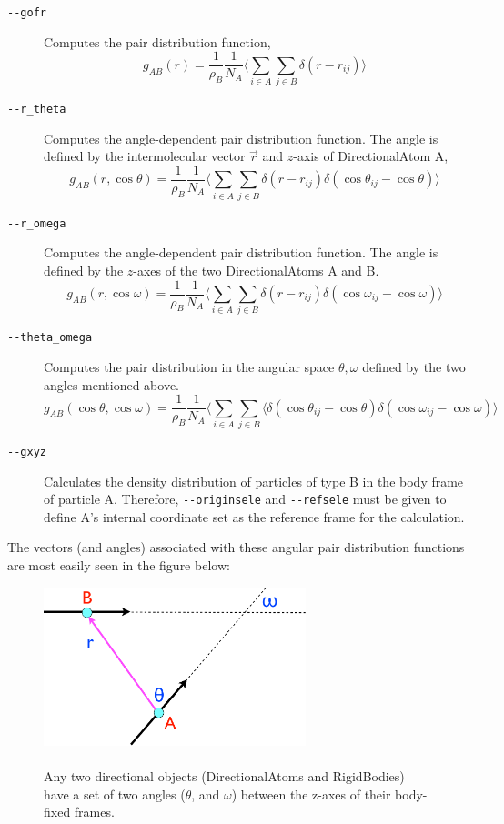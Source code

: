 \documentclass[]{book}
\begin{document}
\begin{description}
\item[{\tt -{}-gofr}] Computes the pair distribution function,
\begin{equation*}
g_{AB}(r) = \frac{1}{\rho_B}\frac{1}{N_A} \langle \sum_{i \in A}
\sum_{j \in B} \delta(r - r_{ij}) \rangle
\end{equation*}
\item[{\tt -{}-r\_theta}] Computes the angle-dependent pair distribution
function. The angle is defined by the intermolecular vector $\vec{r}$ and
$z$-axis of DirectionalAtom A,
\begin{equation*}
g_{AB}(r, \cos \theta) = \frac{1}{\rho_B}\frac{1}{N_A} \langle \sum_{i \in A}
\sum_{j \in B} \delta(r - r_{ij}) \delta(\cos \theta_{ij} - \cos \theta)\rangle
\end{equation*}
\item[{\tt -{}-r\_omega}] Computes the angle-dependent pair distribution
function. The angle is defined by the $z$-axes of the two
DirectionalAtoms A and B. 
\begin{equation*}
g_{AB}(r, \cos \omega) = \frac{1}{\rho_B}\frac{1}{N_A} \langle \sum_{i \in A}
\sum_{j \in B} \delta(r - r_{ij}) \delta(\cos \omega_{ij} - \cos \omega)\rangle
\end{equation*}
\item[{\tt -{}-theta\_omega}] Computes the pair distribution in the angular
space $\theta, \omega$ defined by the two angles mentioned above.
\begin{equation*}
g_{AB}(\cos\theta, \cos \omega) = \frac{1}{\rho_B}\frac{1}{N_A} \langle \sum_{i \in A}
\sum_{j \in B} \langle \delta(\cos \theta_{ij} - \cos \theta)
\delta(\cos \omega_{ij} - \cos \omega)\rangle
\end{equation*}
\item[{\tt -{}-gxyz}] Calculates the density distribution of particles of type
B in the body frame of particle A. Therefore, {\tt -{}-originsele} and
{\tt -{}-refsele} must be given to define A's internal coordinate set as
the reference frame for the calculation.
\end{description}

The vectors (and angles) associated with these angular pair
distribution functions are most easily seen in the figure below:

\begin{figure}
\centering
\includegraphics[width=3in]{definition.pdf}
\caption[Definitions of the angles between directional objects]{ \\ Any
two directional objects (DirectionalAtoms and RigidBodies) have a set
of two angles ($\theta$, and $\omega$) between the z-axes of their
body-fixed frames.} 
\label{fig:gofr}
\end{figure}
\end{document}
